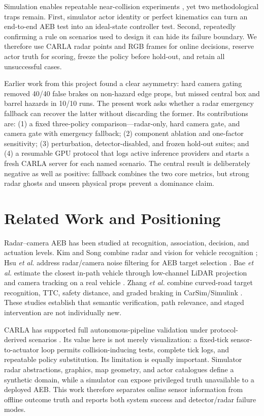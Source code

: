 \documentclass[conference]{IEEEtran}
\begin{document}
Simulation enables repeatable near-collision experiments
\cite{dosovitskiy2017carla,kang2019testing}, yet two methodological traps remain.
First, simulator actor identity or perfect kinematics can turn an end-to-end AEB
test into an ideal-state controller test. Second, repeatedly confirming a rule
on scenarios used to design it can hide its failure boundary. We therefore use
CARLA radar points and RGB frames for online decisions, reserve actor truth for
scoring, freeze the policy before hold-out, and retain all unsuccessful cases.

Earlier work from this project found a clear asymmetry: hard camera gating
removed 40/40 false brakes on non-hazard edge props, but missed central box and
barrel hazards in 10/10 runs. The present work asks whether a radar emergency
fallback can recover the latter without discarding the former. Its contributions
are: (1) a fixed three-policy comparison---radar-only, hard camera gate, and
camera gate with emergency fallback; (2) component ablation and one-factor
sensitivity; (3) perturbation, detector-disabled, and frozen hold-out suites;
and (4) a resumable GPU protocol that logs active inference providers and starts
a fresh CARLA server for each named scenario. The central result is deliberately
negative as well as positive: fallback combines the two core metrics, but strong
radar ghosts and unseen physical props prevent a dominance claim.

\section{Related Work and Positioning}
Radar--camera AEB has been studied at recognition, association, decision, and
actuation levels. Kim and Song combine radar and vision for vehicle recognition
\cite{kim2013vehicle}; Hsu \emph{et al.} address radar/camera noise filtering
for AEB target selection \cite{hsu2015noise}. Bae \emph{et al.} estimate the
closest in-path vehicle through low-channel LiDAR projection and camera tracking
on a real vehicle \cite{bae2021cipv}. Zhang \emph{et al.} combine curved-road
target recognition, TTC, safety distance, and graded braking in
CarSim/Simulink \cite{zhang2023curved}. These studies establish that semantic
verification, path relevance, and staged intervention are not individually new.

CARLA has supported full autonomous-pipeline validation under protocol-derived
scenarios \cite{gomez2022carla}. Its value here is not merely visualization: a
fixed-tick sensor-to-actuator loop permits collision-inducing tests, complete
tick logs, and repeatable policy substitution. Its limitation is equally
important. Simulator radar abstractions, graphics, map geometry, and actor
catalogues define a synthetic domain, while a simulator can expose privileged
truth unavailable to a deployed AEB. This work therefore separates online
sensor information from offline outcome truth and reports both system success
and detector/radar failure modes.
\end{document}
